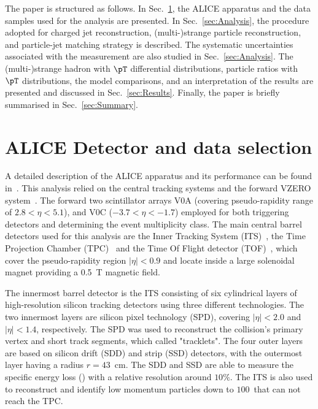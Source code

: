 \documentclass[ALICE,manyauthors]{cernphprep}
\begin{document}
The paper is structured as follows.
In Sec.~\ref{sec:Detector}, the ALICE apparatus and the data samples used for the analysis are presented. In Sec.~\ref{sec:Analysis}, the procedure adopted for charged jet reconstruction, (multi-)strange particle reconstruction, and particle-jet matching strategy is described.
The systematic uncertainties associated with the measurement are also studied in Sec.~\ref{sec:Analysis}.
The (multi-)strange hadron with $\pT$ differential distributions, particle ratios with $\pT$ distributions, the model comparisons, and an interpretation of the results are presented and discussed in Sec.~\ref{sec:Results}. Finally, the paper is briefly summarised in Sec.~\ref{sec:Summary}. 

\section{ALICE Detector and data selection}%
\label{sec:Detector}

A detailed description of the ALICE apparatus and its performance can be found in~\cite{Collaboration_2008, Abelev:2014ffa}.
This analysis relied on the central tracking systems and the forward VZERO system~\cite{collaboration_2013}.
The forward two scintillator arrays V0A (covering pseudo-rapidity range of $2.8 < \eta < 5.1$), and V0C ($-3.7 < \eta < -1.7$) employed for both triggering detectors and determining the event multiplicity class.
The main central barrel detectors used for this analysis are the Inner Tracking System (ITS)~\cite{collaboration_2010}, the Time Projection Chamber (TPC)~\cite{ALME2010316} and the Time Of Flight detector (TOF)~\cite{PIDwithTOF, TOF, TOFResults, Carnesecchi:2018oss}, which cover the pseudo-rapidity region $|\eta| < 0.9$ and locate inside a large solenoidal magnet providing a 0.5~T magnetic field.

The innermost barrel detector is the ITS consisting of six cylindrical layers of high-resolution silicon tracking detectors using three different technologies.
The two innermost layers are silicon pixel technology (SPD), covering $|\eta| < 2.0$ and $|\eta| < 1.4$, respectively.
The SPD was used to reconstruct the collision's primary vertex and short track segments, which called "tracklets".
The four outer layers are based on silicon drift (SDD) and strip (SSD) detectors, with the outermost layer having a radius $r = 43$~cm.
The SDD and SSD are able to measure the specific energy loss (\dEdx) with a relative resolution around $10\%$.
The ITS is also used to reconstruct and identify low momentum particles down to $100$~\MeVc that can not reach the TPC.
\end{document}
